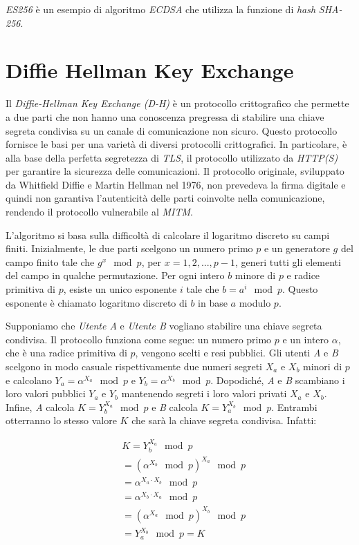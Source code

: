\noindent \emph{ES256} è un esempio di algoritmo \emph{ECDSA} che utilizza la funzione di \emph{hash} \emph{SHA-256}.


\section{Diffie Hellman Key Exchange}
Il \emph{Diffie-Hellman Key Exchange (D-H)} è un protocollo crittografico che permette a due parti che non hanno una conoscenza pregressa di stabilire una chiave segreta condivisa su un canale di comunicazione non sicuro.
Questo protocollo fornisce le basi per una varietà di diversi protocolli crittografici. In particolare, è alla base della perfetta segretezza di \emph{TLS}, il protocollo utilizzato da \emph{HTTP(S)} per garantire la sicurezza delle comunicazioni.
Il protocollo originale, sviluppato da Whitfield Diffie e Martin Hellman nel 1976, non prevedeva la firma digitale e quindi non garantiva l'autenticità delle parti coinvolte nella comunicazione, rendendo il protocollo vulnerabile al \emph{\gls{MITM}}.

L'algoritmo si basa sulla difficoltà di calcolare il logaritmo discreto su campi finiti.
Inizialmente, le due parti scelgono un numero primo $p$ e un generatore $g$ del campo finito tale che $g^x \mod p$, per $x = 1, 2, ..., p-1$, generi tutti gli elementi del campo in qualche permutazione.
Per ogni intero $b$ minore di $p$ e radice primitiva di $p$, esiste un unico esponente $i$ tale che $b = a^i \mod p$. Questo esponente è chiamato logaritmo discreto di $b$ in base $a$ modulo $p$.

Supponiamo che \emph{Utente A} e \emph{Utente B} vogliano stabilire una chiave segreta condivisa. Il protocollo funziona come segue:
un numero primo $p$ e un intero $\alpha$, che è una radice primitiva di $p$, vengono scelti e resi pubblici. Gli utenti \emph{A} e \emph{B} scelgono in modo casuale rispettivamente due numeri segreti $X_a$ e $X_b$ minori di $p$ e calcolano $Y_a = \alpha^{X_a} \mod p$ e $Y_b = \alpha^{X_b} \mod p$.
Dopodiché, \emph{A} e \emph{B} scambiano i loro valori pubblici $Y_a$ e $Y_b$ mantenendo segreti i loro valori privati $X_a$ e $X_b$.
Infine, \emph{A} calcola $K = Y_b^{X_a} \mod p$ e \emph{B} calcola $K = Y_a^{X_b} \mod p$. Entrambi otterranno lo stesso valore $K$ che sarà la chiave segreta condivisa.
Infatti:

\begin{equation}
	\begin{aligned}
		&K = Y_b^{X_a} \mod p \\
		&= (\alpha^{X_b} \mod p)^{X_a} \mod p \\
		&= \alpha^{X_a \cdot X_b} \mod p \\
		&= \alpha^{X_b \cdot X_a} \mod p \\
		&= (\alpha^{X_a} \mod p)^{X_b} \mod p \\
		&= Y_a^{X_b} \mod p = K
	\end{aligned}
\end{equation}

